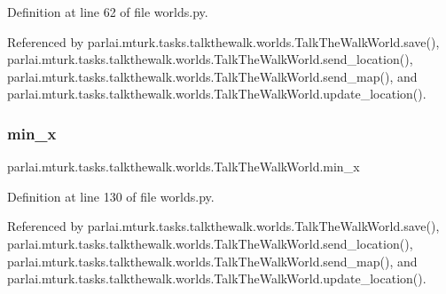 Definition at line 62 of file worlds.\+py.



Referenced by parlai.\+mturk.\+tasks.\+talkthewalk.\+worlds.\+Talk\+The\+Walk\+World.\+save(), parlai.\+mturk.\+tasks.\+talkthewalk.\+worlds.\+Talk\+The\+Walk\+World.\+send\+\_\+location(), parlai.\+mturk.\+tasks.\+talkthewalk.\+worlds.\+Talk\+The\+Walk\+World.\+send\+\_\+map(), and parlai.\+mturk.\+tasks.\+talkthewalk.\+worlds.\+Talk\+The\+Walk\+World.\+update\+\_\+location().

\mbox{\label{classparlai_1_1mturk_1_1tasks_1_1talkthewalk_1_1worlds_1_1TalkTheWalkWorld_a052a53941b53e0cc5cf2494d8a78d24a}} 
\subsubsection{\texorpdfstring{min\+\_\+x}{min\_x}}
{\footnotesize\ttfamily parlai.\+mturk.\+tasks.\+talkthewalk.\+worlds.\+Talk\+The\+Walk\+World.\+min\+\_\+x}



Definition at line 130 of file worlds.\+py.



Referenced by parlai.\+mturk.\+tasks.\+talkthewalk.\+worlds.\+Talk\+The\+Walk\+World.\+save(), parlai.\+mturk.\+tasks.\+talkthewalk.\+worlds.\+Talk\+The\+Walk\+World.\+send\+\_\+location(), parlai.\+mturk.\+tasks.\+talkthewalk.\+worlds.\+Talk\+The\+Walk\+World.\+send\+\_\+map(), and parlai.\+mturk.\+tasks.\+talkthewalk.\+worlds.\+Talk\+The\+Walk\+World.\+update\+\_\+location().

\mbox{\label{classparlai_1_1mturk_1_1tasks_1_1talkthewalk_1_1worlds_1_1TalkTheWalkWorld_a62b94a1c38611e9c7db1dfb9dcb1da69}} 
